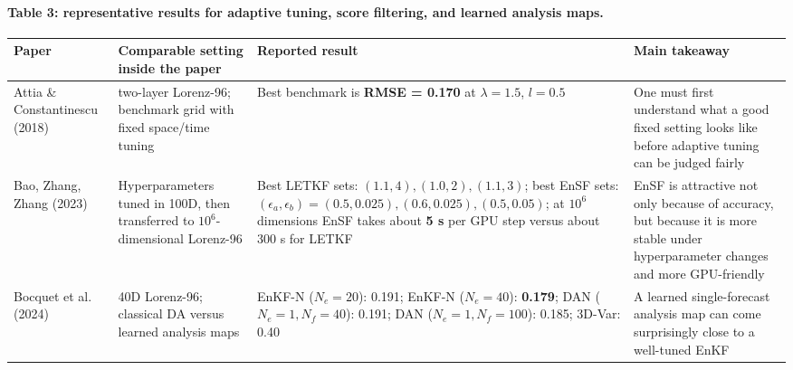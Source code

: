 \documentclass[12pt,a4paper]{article}
\begin{document}
\paragraph{Table 3: representative results for adaptive tuning, score filtering, and learned analysis maps.}
\begin{center}
\small
\begin{tabular}{>{\raggedright\arraybackslash}p{2.5cm} >{\raggedright\arraybackslash}p{4.3cm} >{\raggedright\arraybackslash}p{4.8cm} >{\raggedright\arraybackslash}p{2.1cm}}
\toprule
Paper & Comparable setting inside the paper & Reported result & Main takeaway \\
\midrule
Attia \& Constantinescu (2018) & two-layer Lorenz-96; benchmark grid with fixed space/time tuning & Best benchmark is \textbf{RMSE = 0.170} at \(\lambda=1.5\), \(l=0.5\) & One must first understand what a good fixed setting looks like before adaptive tuning can be judged fairly \\
Bao, Zhang, Zhang (2023) & Hyperparameters tuned in 100D, then transferred to \(10^6\)-dimensional Lorenz-96 & Best LETKF sets: \((1.1,4),(1.0,2),(1.1,3)\); best EnSF sets: \((\epsilon_a,\epsilon_b)=(0.5,0.025),(0.6,0.025),(0.5,0.05)\); at \(10^6\) dimensions EnSF takes about \textbf{5 s} per GPU step versus about 300 s for LETKF & EnSF is attractive not only because of accuracy, but because it is more stable under hyperparameter changes and more GPU-friendly \\
Bocquet et al. (2024) & 40D Lorenz-96; classical DA versus learned analysis maps & EnKF-N (\(N_e=20\)): 0.191; EnKF-N (\(N_e=40\)): \textbf{0.179}; DAN (\(N_e=1,N_f=40\)): 0.191; DAN (\(N_e=1,N_f=100\)): 0.185; 3D-Var: 0.40 & A learned single-forecast analysis map can come surprisingly close to a well-tuned EnKF \\
\bottomrule
\end{tabular}
\end{center}
\end{document}
